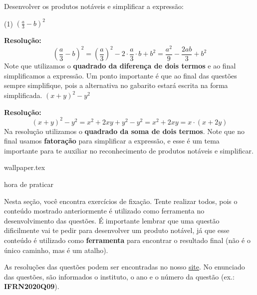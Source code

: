 \documentclass[fleqn,10pt]{article}
\begin{document}

\begin{Exercicio}
Desenvolver os produtos notáveis e simplificar a expressão:
\begin{tasks}(1)
        \task \( \left( \frac{a}{3}-b \right)^2 \)
        
        {\bf Resolução:}
            \[ \left( \frac{a}{3}-b \right)^2 = \left( \frac{a}{3} \right)^2 - 2 \cdot \frac{a}{3} \cdot b + b^2 = \frac{a^2}{9} - \frac{2ab}{3} + b^2 \]
        Note que utilizamos o \textbf{quadrado da diferença de dois termos} e ao final simplificamos a expressão. Um ponto importante é que ao final das questões sempre simplifique, pois a alternativa no gabarito estará escrita na forma simplificada.
        \task \( ( x + y )^2 - y^2 \)
        
        {\bf Resolução:}
            \[ ( x + y )^2 - y^2 = x^2+2xy+y^2 -y^2 = x^2+2xy = x \cdot (x+2y) \]
        Na resolução utilizamos o \textbf{quadrado da soma de dois termos}. Note que no final usamos \textbf{fatoração} para simplificar a expressão, e esse é um tema importante para te auxiliar no reconhecimento de produtos notáveis e simplificar. 
    \end{tasks}
\end{Exercicio}

\newpage
{wallpaper.tex} %

 \begin{center}
            {\LARGE {\sc hora de praticar}}
        \end{center}

Nesta seção, você encontra exercícios de fixação. Tente realizar todos, pois o conteúdo mostrado anteriormente é utilizado como ferramenta no desenvolvimento das questões. É importante lembrar que uma questão dificilmente vai te pedir para desenvolver um produto notável, já que esse conteúdo é utilizado como \textbf{ferramenta} para encontrar o resultado final (não é o único caminho, mas é um atalho).

As resoluções das questões podem ser encontradas no nosso \href{https://prepif.herokuapp.com/instituicoes}{site}. No enunciado das questões, são informados o instituto, o ano e o número da questão (ex.: \textbf{IFRN2020Q09}).
\end{document}
